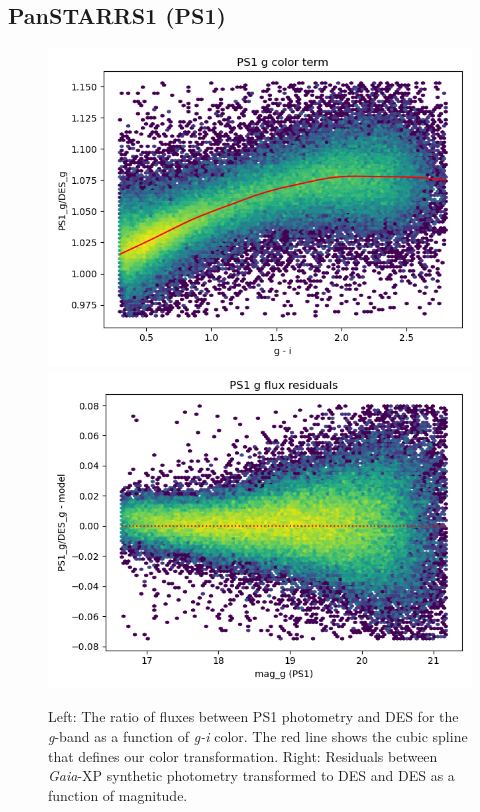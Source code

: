 \clearpage
\subsection{PanSTARRS1 (PS1)}
\label{sec:ps1-color}
\begin{figure}
    \includegraphics[width=0.49\linewidth]{./figures/color_terms/PS1_to_DES_band_g_color_term.png}
    \includegraphics[width=0.49\linewidth]{./figures/color_terms/PS1_to_DES_band_g_flux_residuals.png}
    \caption{Left: The ratio of fluxes between PS1 photometry and DES for the \textit{g}-band as a function of \textit{g-i} color. The red line shows the cubic spline that defines our color transformation.
    Right: Residuals between \emph{Gaia}-XP synthetic photometry transformed to DES and DES as a function of magnitude.}
    \label{fig:acolor-ps1-g}
\end{figure}

